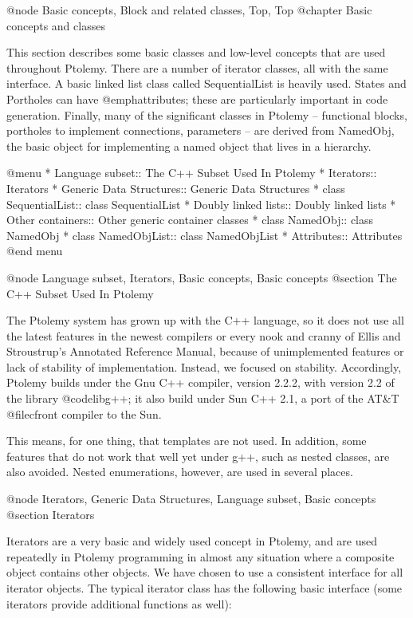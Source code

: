 @node Basic concepts, Block and related classes, Top, Top
@chapter Basic concepts and classes

This section describes some basic classes and low-level concepts that
are used throughout Ptolemy.  There are a number of iterator classes,
all with the same interface.  A basic linked list class called
SequentialList is heavily used.  States and Portholes can have
@emph{attributes}; these are particularly important in code generation.
Finally, many of the significant
classes in Ptolemy -- functional blocks, portholes to implement
connections, parameters -- are derived from NamedObj, the basic object
for implementing a named object that lives in a hierarchy.

@menu
* Language subset::             The C++ Subset Used In Ptolemy
* Iterators::                   Iterators
* Generic Data Structures::     Generic Data Structures
* class SequentialList::        class SequentialList
* Doubly linked lists::         Doubly linked lists
* Other containers::            Other generic container classes
* class NamedObj::              class NamedObj
* class NamedObjList::          class NamedObjList
* Attributes::                  Attributes
@end menu

@node Language subset, Iterators, Basic concepts, Basic concepts
@section The C++ Subset Used In Ptolemy

The Ptolemy system has grown up with the C++ language, so it does not
use all the latest features in the newest compilers or every nook and
cranny of Ellis and Stroustrup's Annotated Reference Manual, because
of unimplemented features or lack of stability of implementation.
Instead, we focused on stability.  Accordingly, Ptolemy builds under
the Gnu C++ compiler, version 2.2.2, with version 2.2 of the library
@code{libg++}; it also build under Sun C++ 2.1, a port of the AT&T
@file{cfront} compiler to the Sun.

This means, for one thing, that templates are not used.  In addition,
some features that do not work that well yet under g++, such as
nested classes, are also avoided.  Nested enumerations, however,
are used in several places.

@node Iterators, Generic Data Structures, Language subset, Basic concepts
@section Iterators

Iterators are a very basic and widely used concept in Ptolemy, and are
used repeatedly in Ptolemy programming in almost any situation where a
composite object contains other objects.  We have chosen to use a
consistent interface for all iterator objects.  The typical iterator
class has the following basic interface (some iterators provide additional
functions as well):


